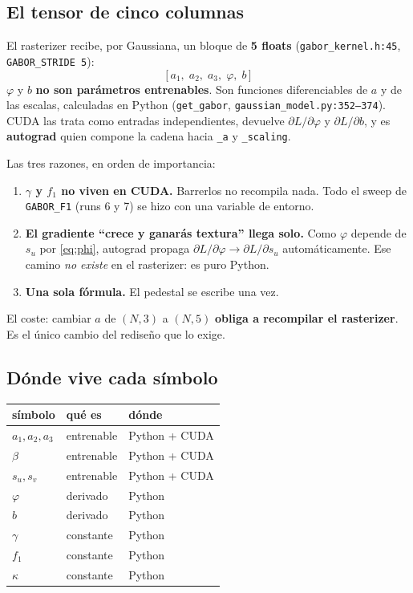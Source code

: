\documentclass[12pt]{extarticle}
\newcommand{\code}[1]{\texttt{#1}}
\begin{document}
\subsection{El tensor de cinco columnas}

El rasterizer recibe, por Gaussiana, un bloque de \textbf{5 floats}
(\code{gabor\_kernel.h:45}, \code{GABOR\_STRIDE 5}):
\[
\bigl[\,a_1,\;a_2,\;a_3,\;\varphi,\;b\,\bigr]
\]
$\varphi$ y $b$ \textbf{no son parámetros entrenables}. Son funciones
diferenciables de $a$ y de las escalas, calculadas en Python
(\code{get\_gabor}, \code{gaussian\_model.py:352--374}). CUDA las trata como
entradas independientes, devuelve $\partial L/\partial\varphi$ y
$\partial L/\partial b$, y es \textbf{autograd} quien compone la cadena hacia
\code{\_a} y \code{\_scaling}.

Las tres razones, en orden de importancia:

\begin{enumerate}
\item \textbf{$\gamma$ y $f_1$ no viven en CUDA.} Barrerlos no recompila nada.
      Todo el sweep de \code{GABOR\_F1} (runs 6 y 7) se hizo con una variable
      de entorno.
\item \textbf{El gradiente ``crece y ganarás textura'' llega solo.} Como
      $\varphi$ depende de $s_u$ por \eqref{eq:phi}, autograd propaga
      $\partial L/\partial\varphi \to \partial L/\partial s_u$
      automáticamente. Ese camino \emph{no existe} en el rasterizer: es puro
      Python.
\item \textbf{Una sola fórmula.} El pedestal se escribe una vez.
\end{enumerate}

El coste: cambiar $a$ de $(N,3)$ a $(N,5)$ \textbf{obliga a recompilar el
rasterizer}. Es el único cambio del rediseño que lo exige.

\subsection{Dónde vive cada símbolo}

\begin{center}\small
\begin{tabular}{@{}lll@{}}
\toprule
\textbf{símbolo} & \textbf{qué es} & \textbf{dónde} \\
\midrule
$a_1,a_2,a_3$ & entrenable & Python + CUDA \\
$\beta$       & entrenable & Python + CUDA \\
$s_u,s_v$     & entrenable & Python + CUDA \\
$\varphi$     & derivado   & Python \\
$b$           & derivado   & Python \\
$\gamma$      & constante  & Python \\
$f_1$         & constante  & Python \\
$\kappa$      & constante  & Python \\
\bottomrule
\end{tabular}
\end{center}
\end{document}
